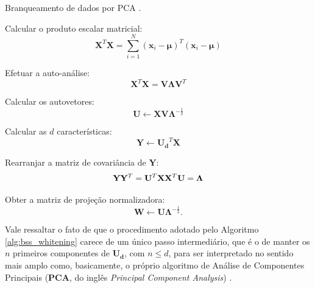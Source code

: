 \begin{algorithm}[H]
    \caption{Branqueamento de dados por PCA \citep{zafeiriou2015notes}.}
    \label{alg:bss_whitening}
    \begin{algorithmic}[1]

        \State Calcular o produto escalar matricial:
        \begin{equation}
            \mathbf{X}^{T}\mathbf{X} = \sum_{i=1}^{N} \left(\mathbf{x}_{i}-\boldsymbol\mu\right)^{T}\left(\mathbf{x}_{i}-\boldsymbol\mu\right)
        \end{equation}

        \State Efetuar a auto-análise:
        \begin{equation}
            \mathbf{X}^{T}\mathbf{X} = \mathbf{V} \boldsymbol\Lambda \mathbf{V}^{T}
        \end{equation}

        \State Calcular os autovetores:
        \begin{equation}
            \mathbf{U} \leftarrow \mathbf{X} \mathbf{V} \boldsymbol\Lambda^{-\frac{1}{2}}
        \end{equation}

        \State Calcular as $d$ características:
        \begin{equation}
            \mathbf{Y} \leftarrow \mathbf{U_{d}}^{T} \mathbf{X}
        \end{equation}

        \State Rearranjar a matriz de covariância de $\mathbf{Y}$:
        \begin{equation}
            \mathbf{Y} \mathbf{Y}^{T} = \mathbf{U}^{T} \mathbf{X} \mathbf{X}^{T} \mathbf{U} = \boldsymbol\Lambda\\
        \end{equation}

        \State Obter a matriz de projeção normalizadora:
        \begin{equation}
            \mathbf{W} \leftarrow \mathbf{U} \boldsymbol\Lambda^{-\frac{1}{2}}.
        \end{equation}

    \end{algorithmic}

\end{algorithm}

Vale ressaltar o fato de que o procedimento adotado pelo Algoritmo \ref{alg:bss_whitening} carece de um único passo intermediário, que é o de manter os $n$ primeiros componentes de $\mathbf{U_{d}}$, com $n\leq d$, para ser interpretado no sentido mais amplo como, basicamente, o próprio algoritmo de Análise de Componentes Principais (\textbf{PCA}, do inglês \textit{Principal Component Analysis}) \citep{doi:10.1080/14786440109462720}.


